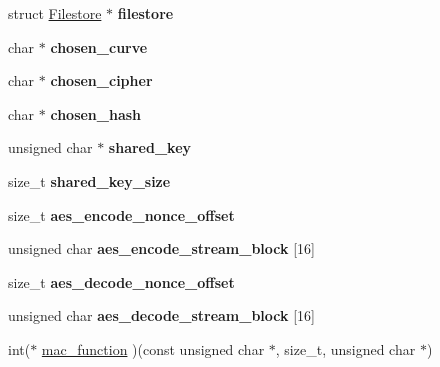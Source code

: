 \begin{DoxyCompactItemize}
\item 
\mbox{\label{struct_session_context_ae959c2ef5175341664b6966768aad47c}} 
struct \mbox{\hyperlink{struct_filestore}{Filestore}} $\ast$ {\bfseries filestore}
\item 
\mbox{\label{struct_session_context_a22e563ed2e2a89786fee5e9d191b0877}} 
char $\ast$ {\bfseries chosen\+\_\+curve}
\item 
\mbox{\label{struct_session_context_ae65bcef5b31bac643ef53e2563a2f983}} 
char $\ast$ {\bfseries chosen\+\_\+cipher}
\item 
\mbox{\label{struct_session_context_ad7f2300d2f8573e1e1dc17e1598fc4a4}} 
char $\ast$ {\bfseries chosen\+\_\+hash}
\item 
\mbox{\label{struct_session_context_a497fa22199af4f47a1651ea85b1a817f}} 
unsigned char $\ast$ {\bfseries shared\+\_\+key}
\item 
\mbox{\label{struct_session_context_a5aeb0e982e0a34784b25270d544e1576}} 
size\+\_\+t {\bfseries shared\+\_\+key\+\_\+size}
\item 
\mbox{\label{struct_session_context_a273c155ce5bded148566b936f59ba734}} 
size\+\_\+t {\bfseries aes\+\_\+encode\+\_\+nonce\+\_\+offset}
\item 
\mbox{\label{struct_session_context_ae1230d7634b9ab9a2ebe9218ad34b5da}} 
unsigned char {\bfseries aes\+\_\+encode\+\_\+stream\+\_\+block} \mbox{[}16\mbox{]}
\item 
\mbox{\label{struct_session_context_af16f4a36d6cae6c5ec9aff913dd16e7f}} 
size\+\_\+t {\bfseries aes\+\_\+decode\+\_\+nonce\+\_\+offset}
\item 
\mbox{\label{struct_session_context_a38669384403f527d386d067ba6147bbe}} 
unsigned char {\bfseries aes\+\_\+decode\+\_\+stream\+\_\+block} \mbox{[}16\mbox{]}
\item 
int($\ast$ \mbox{\hyperlink{struct_session_context_a09e3b1d462b6f6991588822e6b207700}{mac\+\_\+function}} )(const unsigned char $\ast$, size\+\_\+t, unsigned char $\ast$)

\end{DoxyCompactItemize}
